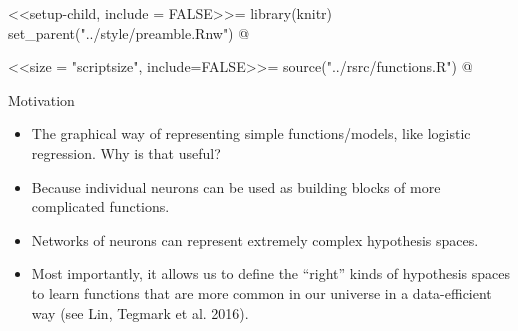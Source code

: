 <<setup-child, include = FALSE>>=
library(knitr)
set_parent("../style/preamble.Rnw")
@

<<size = "scriptsize", include=FALSE>>=
source("../rsrc/functions.R")
@






\begin{vbframe}{Motivation}
\lz
\begin{itemize}
\item The graphical way of representing simple functions/models, like logistic regression. Why is that useful?
\lz
\item Because individual neurons can be used as building blocks of more complicated functions.
\lz
\item Networks of neurons can represent extremely complex hypothesis spaces.
\lz
\item Most importantly, it allows us to define the \enquote{right} kinds of hypothesis spaces to learn functions that are more common in our universe in a data-efficient way (see Lin, Tegmark et al. 2016).
\end{itemize}
\framebreak


\end{vbframe}
